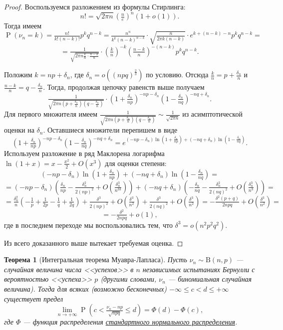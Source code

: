 \documentclass[12pt]{article}
\newtheorem{theorem}{Теорема}
\numberwithin{theorem}{section}
\theoremstyle{definition}
\newcommand{\prob}{\operatorname{P}}
\begin{document}
	\begin{proof}
		Воспользуемся разложением из формулы Стирлинга:
		$$ n! = \sqrt{2\pi n} \left(\tfrac{n}{e}\right)^n(1 + o(1)). $$
		Тогда имеем
		$$ \prob(\nu_n = k) = \tfrac{n!}{k!(n - k)!}p^kq^{n - k}
		= 
		\tfrac{n^n}{k^k (n - k)^{n - k}} \cdot \sqrt{\tfrac{n}{2\pi k(n - k)}} \cdot e^{k + (n - k) - n} p^k q^{n-k} = $$
		$$ = \tfrac{1}{\sqrt{2\pi n \tfrac{k}{n}\cdot\tfrac{n - k}{n}}} 
		\cdot \left(\tfrac{k}{n}\right)^{-k}\left(\tfrac{n - k}{n}\right)^{-(n - k)}p^k q^{n-k}. $$
		
		Положим $ k = np + \delta_n $, где $ \delta_n = o\left((npq)^{\tfrac{2}{3}}\right)  $ по условию.
		Отсюда $ \tfrac{k}{n} = p + \tfrac{\delta_n}{n} $ и $ \tfrac{n - k}{n} = q - \tfrac{\delta_n}{n} $.
		Тогда, продолжая цепочку равенств выше получаем
		$$ \tfrac{1}{\sqrt{2\pi n (p + \tfrac{\delta_n}{n})(q - \tfrac{\delta_n}{n})}} 
		\cdot \left(1 + \tfrac{\delta_n}{np}\right)^{-np - \delta_n}\left(1 - \tfrac{\delta_n}{nq}\right)^{-nq + \delta_n}. $$
		Для первого множителя имеем 
		$ \tfrac{1}{\sqrt{2\pi n (p + \tfrac{\delta_n}{n})(q - \tfrac{\delta_n}{n})}} \sim \tfrac{1}{\sqrt{2\pi n}} $
		из асимптотической оценки на $ \delta_n $.
		Оставшиеся множители перепишем в виде
		$$ \left(1 + \tfrac{\delta_n}{np}\right)^{-np - \delta_n}\left(1 - \tfrac{\delta_n}{nq}\right)^{-nq + \delta_n}
		= e^{(-np - \delta_n)\ln(1 + \tfrac{\delta_n}{np}) + (-nq + \delta_n)\ln(1 - \tfrac{\delta_n}{nq})}. $$
		Используем разложение в ряд Маклорена логарифма $ \ln(1 + x) = x - \tfrac{x^2}{2} + O(x^3) $ для
		оценки степени:
		$$ (-np - \delta_n)\ln(1 + \tfrac{\delta_n}{np}) + (-nq + \delta_n)\ln(1 - \tfrac{\delta_n}{nq}) = $$ 
		$$ = (-np - \delta_n)(\tfrac{\delta_n}{np} - \tfrac{\delta_n^2}{2(np)^2} + O(\tfrac{\delta_n^3}{n^33}))
		+ (-nq + \delta_n)(-\tfrac{\delta_n}{nq} - \tfrac{\delta_n^2}{2(nq)^2} + O(\tfrac{\delta_n^3}{n^3}))
		= $$
		$$ = \tfrac{\delta_n^2}{n}(-\tfrac{1}{p} + \tfrac{1}{2p} - \tfrac{1}{q} + \tfrac{1}{2q})
		+ \tfrac{\delta^3}{2(np)^2} + O(\tfrac{\delta^3}{n^2}) + \tfrac{\delta^3}{2(nq)^2} + O(\tfrac{\delta^3}{n^2})
		= -\tfrac{\delta^2(p + q)}{2npq} + O(\tfrac{\delta^3}{n^2}) = $$ 
		$$ = -\tfrac{\delta^2}{2npq} + o(1), $$
		где в последнем переходе мы воспользовались тем, что $ \delta^3 = o(n^2p^2q^2) $.
		
		Из всего доказанного выше вытекает требуемая оценка.
	\end{proof}
	
	\begin{theorem}[Интегральная теорема Муавра-Лапласа]
		Пусть $ \nu_n \sim \mathrm{B}(n, p) $ --- случайная величина числа <<успехов>> в $ n $ независимых испытаниях Бернулли
		с вероятностью <<успеха>> $ p $ (другими словами, $ \nu_n $ --- биномиальная случайная величина).
		Тогда для всяких (возможно бесконечных) $ -\infty \leqslant c < d \leqslant +\infty $ 
		существует предел
		$$ \lim\limits_{n \to +\infty} \prob(c < \tfrac{\nu_n - np}{\sqrt{npq}} \leqslant d) = \Phi(d) - \Phi(c), $$
		где $ \Phi $ --- функция распределения \hyperlink{standard-normal-distribution}{стандартного нормального распределения}.
	\end{theorem}
	
\end{document}
